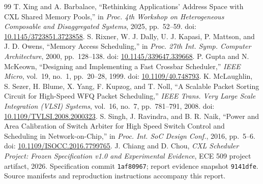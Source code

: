 \documentclass[10pt,letterpaper,twocolumn]{article}
\newcommand{\code}[1]{\texttt{#1}}
\begin{document}
\begin{thebibliography}{99}
 T. Xing and A. Barbalace, ``Rethinking Applications' Address Space with CXL Shared Memory Pools,'' in \emph{Proc. 4th Workshop on Heterogeneous Composable and Disaggregated Systems}, 2025, pp.~52--59. doi: \href{https://doi.org/10.1145/3723851.3723858}{10.1145/3723851.3723858}.
 S. Rixner, W. J. Dally, U. J. Kapasi, P. Mattson, and J. D. Owens, ``Memory Access Scheduling,'' in \emph{Proc. 27th Int. Symp. Computer Architecture}, 2000, pp.~128--138. doi: \href{https://doi.org/10.1145/339647.339668}{10.1145/339647.339668}.
 P. Gupta and N. McKeown, ``Designing and Implementing a Fast Crossbar Scheduler,'' \emph{IEEE Micro}, vol.~19, no.~1, pp.~20--28, 1999. doi: \href{https://doi.org/10.1109/40.748793}{10.1109/40.748793}.
 K. McLaughlin, S. Sezer, H. Blume, X. Yang, F. Kupzog, and T. Noll, ``A Scalable Packet Sorting Circuit for High-Speed WFQ Packet Scheduling,'' \emph{IEEE Trans. Very Large Scale Integration (VLSI) Systems}, vol.~16, no.~7, pp.~781--791, 2008. doi: \href{https://doi.org/10.1109/TVLSI.2008.2000323}{10.1109/TVLSI.2008.2000323}.
 S. Singh, J. Ravindra, and B. R. Naik, ``Power and Area Calibration of Switch Arbiter for High Speed Switch Control and Scheduling in Network-on-Chip,'' in \emph{Proc. Int. SoC Design Conf.}, 2016, pp.~5--6. doi: \href{https://doi.org/10.1109/ISOCC.2016.7799765}{10.1109/ISOCC.2016.7799765}.
 J. Chiang and D. Chou, \emph{CXL Scheduler Project: Frozen Specification v1.0 and Experimental Evidence}, ECE 509 project artifact, 2026. Specification commit \code{1af80967}; report evidence snapshot \code{9141dfe}. Source manifests and reproduction instructions accompany this report.
\end{thebibliography}
\endgroup
\end{document}
